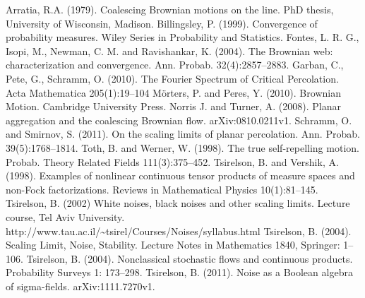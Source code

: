 \begin{thebibliography}{99}
 Arratia, R.A. (1979). Coalescing Brownian motions on
  the line. PhD thesis, University of Wisconsin, Madison.
 Billingsley, P. (1999). Convergence of probability
  measures. Wiley Series in Probability and Statistics.
 Fontes, L. R. G., Isopi, M., Newman, C. M. and
  Ravishankar, K. (2004). The Brownian web: characterization and
  convergence. Ann. Probab. 32(4):2857--2883.
 Garban, C., Pete, G., Schramm,
  O. (2010). The Fourier Spectrum of Critical Percolation.  Acta Mathematica 205(1):19--104
 M\"orters, P. and Peres, Y. (2010). Brownian
  Motion.  Cambridge University Press.
 Norris J. and Turner, A. (2008). Planar
  aggregation and the coalescing Brownian
  flow. arXiv:0810.0211v1.
  Schramm, O. and Smirnov, S. (2011).
  On the scaling limits of planar percolation.
  Ann. Probab. 39(5):1768--1814.
 Toth, B. and Werner, W. (1998). The true
  self-repelling motion. Probab. Theory Related Fields
  111(3):375--452.
  Tsirelson, B. and Vershik, A. (1998). Examples of nonlinear continuous
  tensor products of measure spaces and non-Fock factorizations. Reviews
  in Mathematical Physics 10(1):81--145.
  Tsirelson, B. (2002)
  White noises, black noises and other scaling limits.
  Lecture course, Tel Aviv University.
  http://www.tau.ac.il/\textasciitilde{}tsirel/Courses/Noises/syllabus.html
  Tsirelson, B. (2004).
  Scaling Limit, Noise, Stability.
  Lecture Notes in Mathematics 1840, Springer: 1--106.
 Tsirelson, B. (2004).
  Nonclassical stochastic flows and continuous products.
  Probability Surveys 1: 173--298.
  Tsirelson, B. (2011).
  Noise as a Boolean algebra of sigma-fields.
  arXiv:1111.7270v1.
\end{thebibliography}
